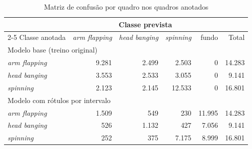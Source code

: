 
\begin{table}[htbp]
\centering
\small
\caption{Matriz de confusão por quadro nos quadros anotados}
\label{tab:confusao-anotados}
\begin{tabular}{lrrrrr}
\toprule
 & \multicolumn{4}{c}{Classe prevista} &  \\
\cmidrule(lr){2-5}
Classe anotada & \textit{arm flapping} & \textit{head banging} & \textit{spinning} & fundo & Total \\
\midrule
\multicolumn{6}{l}{Modelo base (treino original)} \\
\textit{arm flapping} & 9.281 & 2.499 & 2.503 & 0 & 14.283 \\
\textit{head banging} & 3.553 & 2.533 & 3.055 & 0 & 9.141 \\
\textit{spinning} & 2.123 & 2.145 & 12.533 & 0 & 16.801 \\
\midrule
\multicolumn{6}{l}{Modelo com rótulos por intervalo} \\
\textit{arm flapping} & 1.509 & 549 & 230 & 11.995 & 14.283 \\
\textit{head banging} & 526 & 1.132 & 427 & 7.056 & 9.141 \\
\textit{spinning} & 252 & 375 & 7.175 & 8.999 & 16.801 \\
\bottomrule
\end{tabular}
\end{table}
